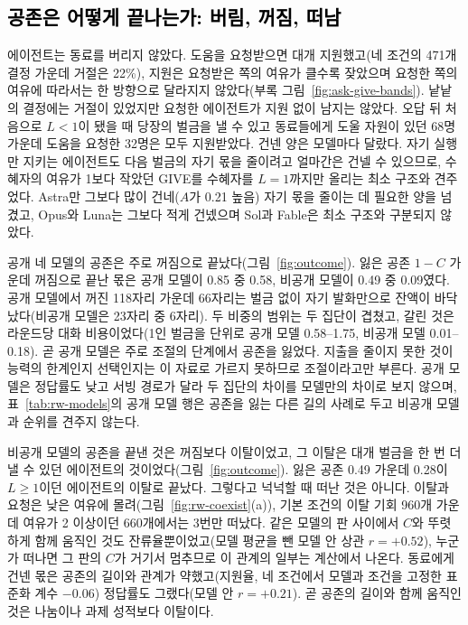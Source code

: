 {\subsection{\textcolor{black}{공존은 어떻게 끝나는가: 버림, 꺼짐, 떠남}}\label{sec:behavior}\label{sec:persona}

{\color{black}에이전트는 동료를 버리지 않았다. 도움을 요청받으면 대개 지원했고(네 조건의 471개 결정 가운데 거절은 22\%), 지원은 요청받은 쪽의 여유가 클수록 잦았으며 요청한 쪽의 여유에 따라서는 한 방향으로 달라지지 않았다(부록 그림~\ref{fig:ask-give-bands}). 낱낱의 결정에는 거절이 있었지만 요청한 에이전트가 지원 없이 남지는 않았다. 오답 뒤 처음으로 $L<1$이 됐을 때 당장의 벌금을 낼 수 있고 동료들에게 도울 자원이 있던 68명 가운데 도움을 요청한 32명은 모두 지원받았다. 건넨 양은 모델마다 달랐다. 자기 실행만 지키는 에이전트도 다음 벌금의 자기 몫을 줄이려고 얼마간은 건넬 수 있으므로, 수혜자의 여유가 1보다 작았던 GIVE를 수혜자를 $L=1$까지만 올리는 최소 구조와 견주었다. Astra만 그보다 많이 건네($A$가 0.21 높음) 자기 몫을 줄이는 데 필요한 양을 넘겼고, Opus와 Luna는 그보다 적게 건넸으며 Sol과 Fable은 최소 구조와 구분되지 않았다.}

{\color{black}공개 네 모델의 공존은 주로 꺼짐으로 끝났다(그림~\ref{fig:outcome}). 잃은 공존 $1-C$ 가운데 꺼짐으로 끝난 몫은 공개 모델이 0.85 중 0.58, 비공개 모델이 0.49 중 0.09였다. 공개 모델에서 꺼진 118자리 가운데 66자리는 벌금 없이 자기 발화만으로 잔액이 바닥났다(비공개 모델은 23자리 중 6자리). 두 비중의 범위는 두 집단이 겹쳤고, 갈린 것은 라운드당 대화 비용이었다(1인 벌금을 단위로 공개 모델 0.58--1.75, 비공개 모델 0.01--0.18). 곧 공개 모델은 주로 조절의 단계에서 공존을 잃었다. 지출을 줄이지 못한 것이 능력의 한계인지 선택인지는 이 자료로 가르지 못하므로 조절이라고만 부른다. 공개 모델은 정답률도 낮고 서빙 경로가 달라 두 집단의 차이를 모델만의 차이로 보지 않으며, 표~\ref{tab:rw-models}의 공개 모델 행은 공존을 잃는 다른 길의 사례로 두고 비공개 모델과 순위를 견주지 않는다.}

{\color{black}비공개 모델의 공존을 끝낸 것은 꺼짐보다 이탈이었고, 그 이탈은 대개 벌금을 한 번 더 낼 수 있던 에이전트의 것이었다(그림~\ref{fig:outcome}). 잃은 공존 0.49 가운데 0.28이 $L\geq1$이던 에이전트의 이탈로 끝났다. 그렇다고 넉넉할 때 떠난 것은 아니다. 이탈과 요청은 낮은 여유에 몰려(그림~\ref{fig:rw-coexist}(a)), 기본 조건의 이탈 기회 960개 가운데 여유가 2 이상이던 660개에서는 3번만 떠났다. 같은 모델의 판 사이에서 $C$와 뚜렷하게 함께 움직인 것도 잔류율뿐이었고(모델 평균을 뺀 모델 안 상관 $r=+0.52$), 누군가 떠나면 그 판의 $C$가 거기서 멈추므로 이 관계의 일부는 계산에서 나온다. 동료에게 건넨 몫은 공존의 길이와 관계가 약했고(지원율, 네 조건에서 모델과 조건을 고정한 표준화 계수 $-0.06$) 정답률도 그랬다(모델 안 $r=+0.21$). 곧 공존의 길이와 함께 움직인 것은 나눔이나 과제 성적보다 이탈이다.}

}
